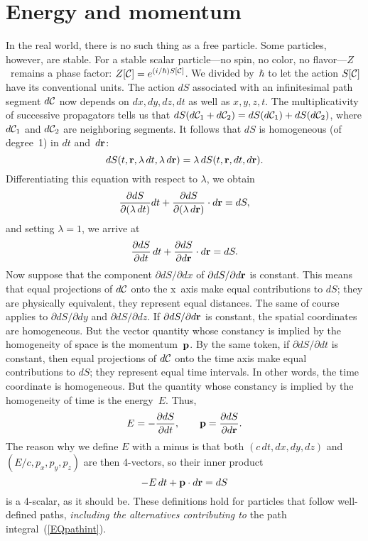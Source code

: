 \documentclass[12pt]{article}
\newcommand{\be}{\begin{equation}}
\newcommand{\ee}{\end{equation}}
\renewcommand{\d}{\partial}
\newcommand{\bp}{{\bf p}}
\newcommand{\br}{{\bf r}}
\newcommand{\cC}{{\cal C}}
\begin{document}
\section{Energy and momentum}
In the real world, there is no such thing as a free particle. Some particles, however, are stable. For a stable scalar particle---no spin, no color, no flavor---$Z$~remains a phase factor: $Z[\cC]=e^{(i/\hbar)S[\cC]}$. We divided by~$\hbar$ to let the action $S[\cC]$ have its conventional units. The action $dS$ associated with an infinitesimal path segment $d\cC$ now depends on $dx,dy,dz,dt$ as well as $x,y,z,t$. The multiplicativity of successive propagators tells us that $dS(d\cC_1+d\cC_2)= dS(d\cC_1)+ dS(d\cC_2)$, where $d\cC_1$ and $d\cC_2$ are neighboring segments. It follows that $dS$ is homogeneous (of degree~1) in $dt$ and~$d\br$:
\be
dS(t,\br,\lambda\,dt,\lambda\,d\br)=\lambda\,dS(t,\br,dt,d\br).
\label{EQhomog}
\ee
Differentiating this equation with respect to $\lambda$, we obtain
\be
\frac{\d dS}{\d(\lambda\,dt)}dt+\frac{\d dS}{\d(\lambda\,d\br)}\cdot d\br=dS,
\ee
and setting $\lambda=1$, we arrive at
\be
\frac{\d dS}{\d dt}\,dt+\frac{\d dS}{\d d\br}\cdot d\br=dS.
\ee
Now suppose that the component $\d dS/\d dx$ of $\d dS/\d d\br$ is constant. This means that equal projections of $d\cC$ onto the x~axis make equal contributions to $dS$; they are physically equivalent, they represent equal distances. The same of course applies to $\d dS/\d dy$ and $\d dS/\d dz$. If $\d dS/\d d\br$ is constant, the spatial coordinates are homogeneous. But the vector quantity whose constancy is implied by the homogeneity of space is the momentum~$\bp$. By the same token, if $\d dS/\d dt$ is constant, then equal projections of $d\cC$ onto the time axis make equal contributions to $dS$; they represent equal time intervals. In other words, the time coordinate is homogeneous. But the quantity whose constancy is implied by the homogeneity of time is the energy~$E$. Thus,
\be
E=-\frac{\d dS}{\d dt},\qquad\bp=\frac{\d dS}{\d d\br}.
\ee
The reason why we define $E$ with a minus is that both $(c\,dt,dx,dy,dz)$ and $(E/c, p_x,p_y,p_z)$ are then 4-vectors, so their inner product
\be
-E\,dt+\bp\cdot d\br=dS
\ee
is a 4-scalar, as it should be. These definitions hold for particles that follow well-defined paths, \textit{including the alternatives contributing to} the path integral~(\ref{EQpathint}).
\end{document}
